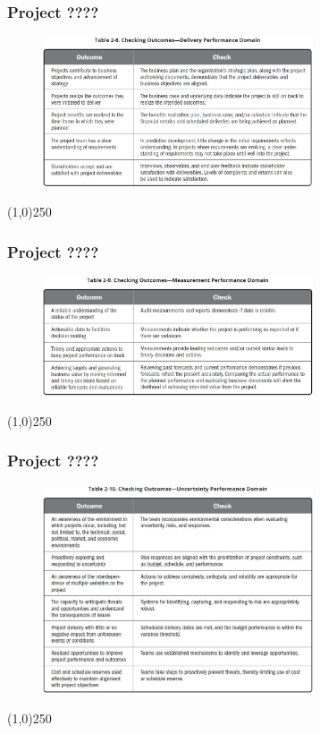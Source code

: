 \begin{frame}
\frametitle{Project ????}
 \begin{figure}
    \centering
        \includegraphics[width = 8cm]{../images/guide/Table2-8.jpg}
    \label{guideTable:2-8}
 \end{figure}
\end{frame}
\begin{center}\line(1,0){250}\end{center}

\begin{frame}
\frametitle{Project ????}
 \begin{figure}
    \centering
        \includegraphics[width = 8cm]{../images/guide/Table2-9.jpg}
    \label{guideTable:2-9}
 \end{figure}
\end{frame}
\begin{center}\line(1,0){250}\end{center}

\begin{frame}
\frametitle{Project ????}
 \begin{figure}
    \centering
        \includegraphics[width = 8cm]{../images/guide/Table2-10.jpg}
    \label{guideTable:2-10}
 \end{figure}
\end{frame}
\begin{center}\line(1,0){250}\end{center}



